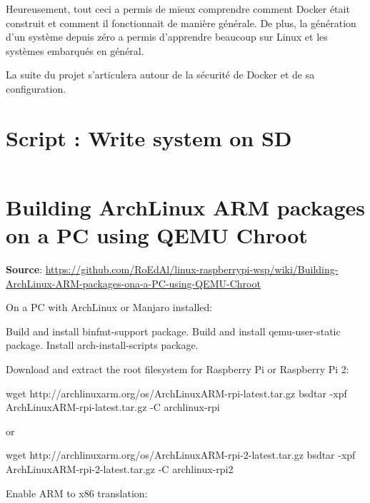 \documentclass[11pt,a4paper,oneside]{report}
\begin{document}
Heureusement, tout ceci a permis de mieux comprendre comment Docker était construit et comment il fonctionnait de manière générale. De plus, la génération d'un système depuis zéro a permis d'apprendre beaucoup sur Linux et les systèmes embarqués en général.

La suite du projet s'articulera autour de la sécurité de Docker et de sa configuration.





\begin{appendices}
  \chapter{Script : Write system on SD}\label{write_system_sd}

  \inputminted[xleftmargin=20pt, linenos=true, breaklines=true, frame=single, framesep=6pt, tabsize=2, fontfamily=courier, fontsize=\small]{bash}{../../write_system_on_sd.sh}
  
  \chapter{Building ArchLinux ARM packages on a PC using QEMU Chroot}\label{archlinux_arm_qemu_chroot}
  
\textbf{Source}: \url{https://github.com/RoEdAl/linux-raspberrypi-wsp/wiki/Building-ArchLinux-ARM-packages-ona-a-PC-using-QEMU-Chroot}

On a PC with ArchLinux or Manjaro installed:

Build and install binfmt-support package.
Build and install qemu-user-static package.
Install arch-install-scripts package.

Download and extract the root filesystem for Raspberry Pi or Raspberry Pi 2:

\begin{bashcode}
wget http://archlinuxarm.org/os/ArchLinuxARM-rpi-latest.tar.gz   
bsdtar -xpf ArchLinuxARM-rpi-latest.tar.gz -C archlinux-rpi
\end{bashcode}

or

\begin{bashcode}
wget http://archlinuxarm.org/os/ArchLinuxARM-rpi-2-latest.tar.gz   
bsdtar -xpf ArchLinuxARM-rpi-2-latest.tar.gz -C archlinux-rpi2
\end{bashcode}

Enable ARM to x86 translation:


\end{appendices}
\end{document}

